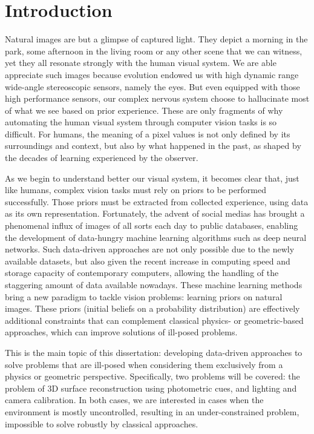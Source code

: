 \chapter*{Introduction}         %

Natural images are but a glimpse of captured light. They depict a morning in the park, some afternoon in the living room or any other scene that we can witness, yet they all resonate strongly with the human visual system. We are able appreciate such images because evolution endowed us with high dynamic range wide-angle stereoscopic sensors, namely the eyes. But even equipped with those high performance sensors, our complex nervous system choose to hallucinate most of what we see based on prior experience. These are only fragments of why automating the human visual system through computer vision tasks is so difficult. For humans, the meaning of a pixel values is not only defined by its surroundings and context, but also by what happened in the past, as shaped by the decades of learning experienced by the observer.

As we begin to understand better our visual system, it becomes clear that, just like humans, complex vision tasks must rely on priors to be performed successfully. Those priors must be extracted from collected experience, using data as its own representation. Fortunately, the advent of social medias has brought a phenomenal influx of images of all sorts each day to public databases, enabling the development of data-hungry machine learning algorithms such as deep neural networks. Such data-driven approaches are not only possible due to the newly available datasets, but also given the recent increase in computing speed and storage capacity of contemporary computers, allowing the handling of the staggering amount of data available nowadays. These machine learning methods bring a new paradigm to tackle vision problems: learning priors on natural images. These priors (initial beliefs on a probability distribution) are effectively additional constraints that can complement classical physics- or geometric-based approaches, which can improve solutions of ill-posed problems.

This is the main topic of this dissertation: developing data-driven approaches to solve problems that are ill-posed when considering them exclusively from a physics or geometric perspective. Specifically, two problems will be covered: the problem of 3D surface reconstruction using photometric cues, and lighting and camera calibration. In both cases, we are interested in cases when the environment is mostly uncontrolled, resulting in an under-constrained problem, impossible to solve robustly by classical approaches.

